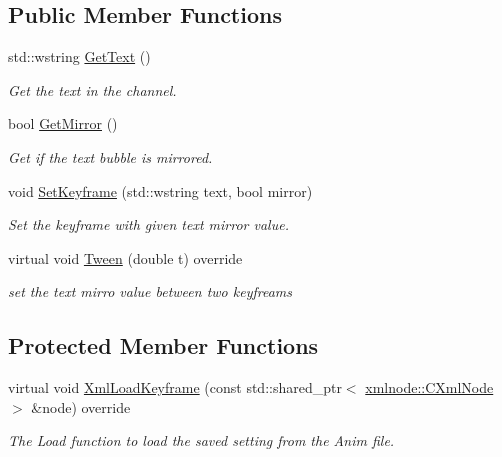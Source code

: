 \subsection*{Public Member Functions}
\begin{DoxyCompactItemize}
\item 
\hypertarget{class_c_anim_channel_text_ae18bb8f72259762f55a3a66c19d89163}{std\+::wstring \hyperlink{class_c_anim_channel_text_ae18bb8f72259762f55a3a66c19d89163}{Get\+Text} ()}\label{class_c_anim_channel_text_ae18bb8f72259762f55a3a66c19d89163}

\begin{DoxyCompactList}\small\item\em Get the text in the channel. \end{DoxyCompactList}\item 
\hypertarget{class_c_anim_channel_text_afcba15848a3ab98d7e418b24a7bdbe40}{bool \hyperlink{class_c_anim_channel_text_afcba15848a3ab98d7e418b24a7bdbe40}{Get\+Mirror} ()}\label{class_c_anim_channel_text_afcba15848a3ab98d7e418b24a7bdbe40}

\begin{DoxyCompactList}\small\item\em Get if the text bubble is mirrored. \end{DoxyCompactList}\item 
void \hyperlink{class_c_anim_channel_text_a4defed1bebd5453add702bdee67b0dd8}{Set\+Keyframe} (std\+::wstring text, bool mirror)
\begin{DoxyCompactList}\small\item\em Set the keyframe with given text mirror value. \end{DoxyCompactList}\item 
virtual void \hyperlink{class_c_anim_channel_text_a6bf49ec2ab6856c8741999e64031f99f}{Tween} (double t) override
\begin{DoxyCompactList}\small\item\em set the text mirro value between two keyfreams \end{DoxyCompactList}\end{DoxyCompactItemize}
\subsection*{Protected Member Functions}
\begin{DoxyCompactItemize}
\item 
virtual void \hyperlink{class_c_anim_channel_text_af30a93b795d45ad49c498c0e96313afd}{Xml\+Load\+Keyframe} (const std\+::shared\+\_\+ptr$<$ \hyperlink{classxmlnode_1_1_c_xml_node}{xmlnode\+::\+C\+Xml\+Node} $>$ \&node) override
\begin{DoxyCompactList}\small\item\em The Load function to load the saved setting from the Anim file. \end{DoxyCompactList}\end{DoxyCompactItemize}


